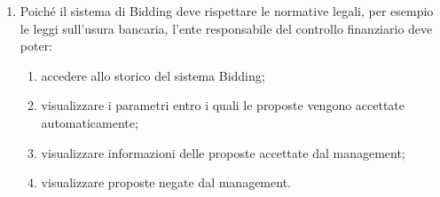 \begin{enumerate}
	\item Poich\'e il sistema di Bidding deve rispettare le normative legali, per esempio le leggi sull'usura bancaria, l'ente responsabile del controllo finanziario deve poter:
	\begin{enumerate}
    	\item accedere allo storico del sistema Bidding;
    	\item visualizzare i parametri entro i quali le proposte vengono accettate automaticamente;
    	\item visualizzare informazioni delle proposte accettate dal management;
    	\item visualizzare proposte negate dal management.
	\end{enumerate}

\end{enumerate}





